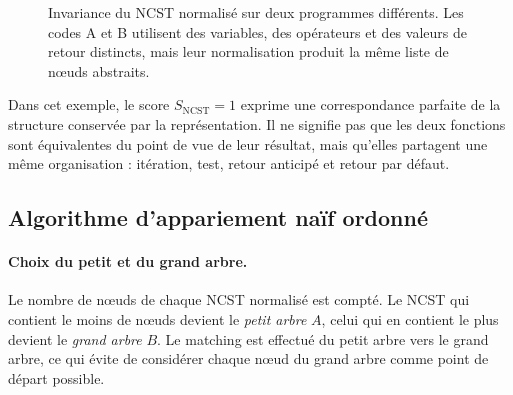 \documentclass[12pt,a4paper,oneside]{report}
\begin{document}
\begin{figure}[htbp]
{%
}
\caption{Invariance du NCST normalisé sur deux programmes différents. Les
codes A et B utilisent des variables, des opérateurs et des valeurs de retour
distincts, mais leur normalisation produit la même liste de nœuds abstraits.}
\label{fig:ncst_equivalence}
\end{figure}

Dans cet exemple, le score $S_{\mathrm{NCST}} = 1$ exprime une correspondance
parfaite de la structure conservée par la représentation. Il ne signifie pas
que les deux fonctions sont équivalentes du point de vue de leur résultat,
mais qu'elles partagent une même organisation : itération, test, retour
anticipé et retour par défaut.

\subsection{Algorithme d'appariement naïf ordonné}
\label{sec:matching}

\paragraph{Choix du petit et du grand arbre.}
Le nombre de nœuds de chaque NCST normalisé est compté. Le NCST qui contient le
moins de nœuds devient le \emph{petit arbre} $A$, celui qui en contient le plus
devient le \emph{grand arbre} $B$. Le matching est effectué du petit arbre vers
le grand arbre, ce qui évite de considérer chaque nœud du grand arbre comme
point de départ possible.
\end{document}
